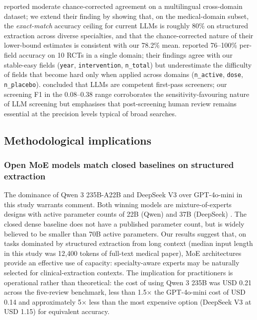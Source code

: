 \documentclass[a4paper,fleqn]{cas-sc}
\begin{document}
\citet{khraisha2024llmsr} reported moderate chance-corrected agreement
on a multilingual cross-domain dataset; we extend their finding by
showing that, on the medical-domain subset, the
\emph{exact-match} accuracy ceiling for current LLMs is roughly 80\% on
structured extraction across diverse specialties, and that the
chance-corrected nature of their lower-bound estimates is consistent
with our 78.2\% mean. \citet{gartlehner2024aisr} reported 76--100\%
per-field accuracy on 10 RCTs in a single domain; their findings agree
with our stable-easy fields (\texttt{year}, \texttt{intervention},
\texttt{n\_total}) but underestimate the difficulty of fields that
become hard only when applied across domains
(\texttt{n\_active}, \texttt{dose}, \texttt{n\_placebo}).
\citet{guo2024llmsr} concluded that LLMs are competent first-pass
screeners; our screening F1 in the 0.08--0.38 range corroborates the
sensitivity-favouring nature of LLM screening but emphasises that
post-screening human review remains essential at the precision levels
typical of broad searches.

\subsection{Methodological implications}

\subsubsection{Open MoE models match closed baselines on structured
extraction}

The dominance of Qwen 3 235B-A22B and DeepSeek V3 over GPT-4o-mini in
this study warrants comment. Both winning models are mixture-of-experts
designs with active parameter counts of 22B (Qwen) and 37B (DeepSeek)
\citep{shazeer2017moe,deepseekv3,yang2025qwen3}. The closed dense
baseline does not have a published parameter count, but is widely
believed to be smaller than 70B active parameters. Our results suggest
that, on tasks dominated by structured extraction from long context
(median input length in this study was 12{,}400 tokens of full-text
medical paper), MoE architectures provide an effective use of capacity:
specialty-aware experts may be naturally selected for clinical-extraction
contexts. The implication for practitioners is operational rather than
theoretical: the cost of using Qwen 3 235B was USD 0.21 across the
five-review benchmark, less than 1.5$\times$ the GPT-4o-mini cost of USD 0.14
and approximately 5$\times$ less than the most expensive option
(DeepSeek V3 at USD 1.15) for equivalent accuracy.
\end{document}
